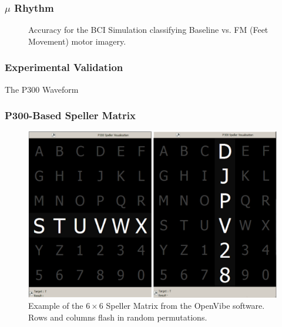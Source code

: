 \documentclass[aspectratio=169]{beamer}
\begin{document}
	
	\begin{frame}
	\frametitle{$\mu$ Rhythm}
   \begin{figure}[thpb]
      \centering
      \setlength\fboxsep{0pt}
	  \setlength\fboxrule{0.5pt}
      \caption{\centering Accuracy for the BCI Simulation classifying Baseline vs. FM (Feet Movement) motor imagery.}
      \label{figure3}
   \end{figure} 	
	\end{frame}	  
	    
\begin{frame}
\frametitle{Experimental Validation}
\begin{center}
\LARGE The P300 Waveform
\end{center}
\end{frame}

\begin{frame}
\frametitle{P300-Based Speller Matrix}
\begin{figure}[h!]
\centering
\includegraphics[scale=0.3]{images/openvibep300matrix.png}
\caption[P300 Speller Matrix]{Example of the $6 \times 6$ Speller Matrix from the OpenVibe software.  Rows and columns flash in random permutations.}
\label{fig:p300matrix}
\end{figure}
\end{frame}    
\end{document}
